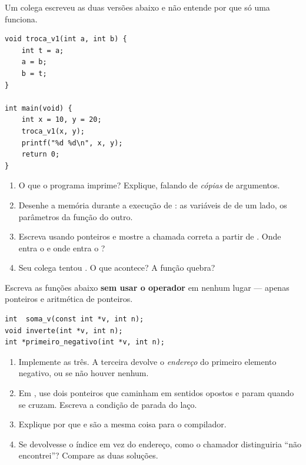 \documentclass[11pt,a4paper]{article}
\begin{document}
Um colega escreveu as duas versões abaixo e não entende por que só uma funciona.

\begin{lstlisting}
void troca_v1(int a, int b) {
    int t = a;
    a = b;
    b = t;
}

int main(void) {
    int x = 10, y = 20;
    troca_v1(x, y);
    printf("%d %d\n", x, y);
    return 0;
}
\end{lstlisting}

\begin{enumerate}[label=(\alph*),leftmargin=1.8em,itemsep=1pt]
  \item O que o programa imprime? Explique, falando de \emph{cópias} de argumentos.
  \item Desenhe a memória durante a execução de : as variáveis de
         de um lado, os parâmetros da função do outro.
  \item Escreva  usando ponteiros e mostre a chamada correta a partir
        de . Onde entra o \cd{\&} e onde entra o \cd{*}?
  \item Seu colega tentou . O que acontece? A função quebra?
\end{enumerate}

Escreva as funções abaixo \textbf{sem usar o operador \cd{[\ ]}} em nenhum lugar ---
apenas ponteiros e aritmética de ponteiros.

\begin{lstlisting}
int  soma_v(const int *v, int n);
void inverte(int *v, int n);
int *primeiro_negativo(int *v, int n);
\end{lstlisting}

\begin{enumerate}[label=(\alph*),leftmargin=1.8em,itemsep=1pt]
  \item Implemente as três. A terceira devolve o \emph{endereço} do primeiro elemento
        negativo, ou  se não houver nenhum.
  \item Em , use dois ponteiros que caminham em sentidos opostos e param
        quando se cruzam. Escreva a condição de parada do laço.
  \item Explique por que  e  são a mesma coisa para o compilador.
  \item Se  devolvesse o índice em vez do endereço, como o
        chamador distinguiria ``não encontrei''? Compare as duas soluções.
\end{enumerate}
\end{document}
